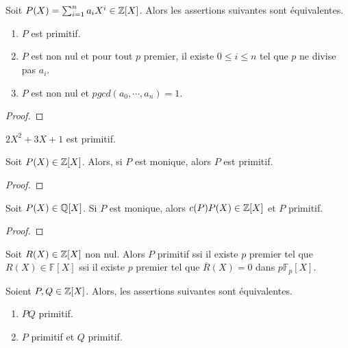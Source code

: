 \begin{proposition}
	Soit $P(X) = \sum_{i = 1}^{n} a_{i} X^{i} \in \mathbb{Z}[X]$. Alors les
	assertions suivantes sont équivalentes.

	\begin{enumerate}
		\item $P$ est primitif.
		\item $P$ est non nul et pour tout $p$ premier, il existe $0 \leq i \leq
			n$ tel que $p$ ne divise pas $a_{i}$.
		\item $P$ est non nul et $pgcd(a_{0}, \cdots, a_{n}) = 1$.
	\end{enumerate}
\end{proposition}

\ifdefined\outputproof
\begin{proof}

\end{proof}
\fi

\begin{exemple}
	$2 X^{2} + 3 X + 1$ est primitif.
\end{exemple}

\begin{proposition}
	Soit $P(X) \in \mathbb{Z}[X]$. Alors, si $P$ est monique, alors $P$ est
	primitif.
\end{proposition}

\ifdefined\outputproof
\begin{proof}

\end{proof}
\fi

\begin{lemma}
	Soit $P(X) \in \mathbb{Q}[X]$. Si $P$ est monique, alors $c(P) P(X) \in
	\mathbb{Z}[X]$ et $P$ primitif.
\end{lemma}

\ifdefined\outputproof
\begin{proof}

\end{proof}
\fi

\begin{remarque}
	Soit $R(X) \in \mathbb{Z}[X]$ non nul. Alors $P$ primitif ssi il existe $p$
	premier tel que $R(X) \in \mathbb{F}[X]$ ssi il existe $p$ premier tel que
	$\overline{R}(X) = 0$ dans $p \mathbb{F}_{p}[X]$.
\end{remarque}

\begin{lemma}
	Soient $P, Q \in \mathbb{Z}[X]$. Alors, les assertions suivantes sont équivalentes.

	\begin{enumerate}
		\item $PQ$ primitif.
		\item $P$ primitif et $Q$ primitif.
	\end{enumerate}
\end{lemma}

